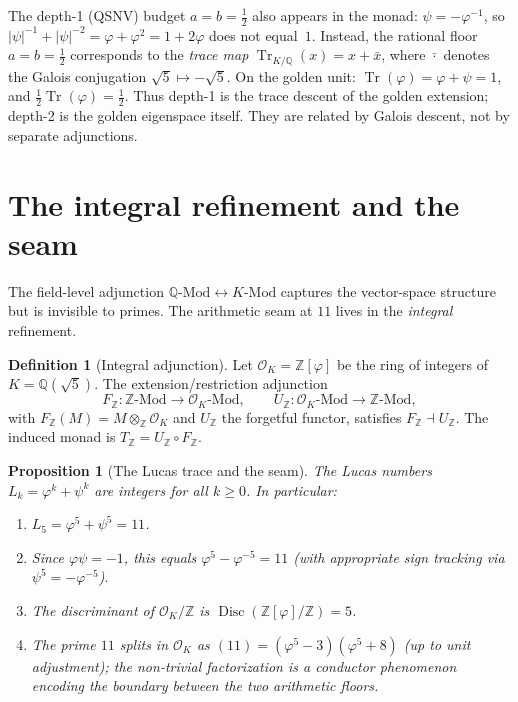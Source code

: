 \documentclass[11pt,a4paper]{article}
\theoremstyle{plain}
\newtheorem{proposition}[theorem]{Proposition}
\theoremstyle{definition}
\newtheorem{definition}[theorem]{Definition}
\theoremstyle{remark}
\numberwithin{equation}{section}
\providecommand{\Z}{\mathbb{Z}}
\providecommand{\Q}{\mathbb{Q}}
\providecommand{\vp}{\varphi}
\providecommand{\ps}{\psi}
\providecommand{\half}{\tfrac{1}{2}}
\providecommand{\Lk}{L}
\DeclareMathOperator{\Tr}{Tr}
\DeclareMathOperator{\Disc}{Disc}
\begin{document}
The depth-1 (QSNV) budget $a = b = \half$ also appears in the
monad: $\ps = -\vp^{-1}$, so $|\ps|^{-1} + |\ps|^{-2} =
\vp + \vp^2 = 1 + 2\vp$ does not equal~$1$.  Instead, the
rational floor $a = b = \half$ corresponds to the
\emph{trace map} $\Tr_{K/\Q}(x) = x + \bar{x}$, where
$\bar{\cdot}$ denotes the Galois conjugation $\sqrt{5} \mapsto
-\sqrt{5}$.  On the golden unit: $\Tr(\vp) = \vp + \ps = 1$,
and $\half \Tr(\vp) = \half$.  Thus depth-1 is the trace
descent of the golden extension; depth-2 is the golden
eigenspace itself.  They are related by Galois descent, not by
separate adjunctions.


\section{The integral refinement and the seam}
\label{sec:integral}

The field-level adjunction $\Q\text{-Mod} \leftrightarrow
K\text{-Mod}$ captures the vector-space structure but is
invisible to primes.  The arithmetic seam at $11$ lives in the
\emph{integral} refinement.

\begin{definition}[Integral adjunction]
\label{def:integral-adjunction}
Let $\mathcal{O}_K = \Z[\vp]$ be the ring of integers of
$K = \Q(\sqrt{5})$.  The extension/restriction adjunction
\[
  F_\Z \colon \Z\text{-Mod} \to \mathcal{O}_K\text{-Mod},
  \qquad
  U_\Z \colon \mathcal{O}_K\text{-Mod} \to \Z\text{-Mod},
\]
with $F_\Z(M) = M \otimes_\Z \mathcal{O}_K$ and $U_\Z$ the
forgetful functor, satisfies $F_\Z \dashv U_\Z$.  The induced
monad is $T_\Z = U_\Z \circ F_\Z$.
\end{definition}

\begin{proposition}[The Lucas trace and the seam]
\label{prop:seam-integral}
The Lucas numbers $\Lk_k = \vp^k + \ps^k$ are integers for all
$k \geq 0$.  In particular:
\begin{enumerate}[label=(\roman*)]
  \item $\Lk_5 = \vp^5 + \ps^5 = 11$.
  \item Since $\vp \ps = -1$, this equals
    $\vp^5 - \vp^{-5} = 11$ (with appropriate sign tracking via
    $\ps^5 = -\vp^{-5}$).
  \item The discriminant of $\mathcal{O}_K / \Z$ is
    $\Disc(\Z[\vp] / \Z) = 5$.
  \item The prime $11$ splits in $\mathcal{O}_K$ as
    $(11) = (\vp^5 - 3)(\vp^5 + 8)$ (up to unit adjustment);
    the non-trivial factorization is a conductor phenomenon
    encoding the boundary between the two arithmetic floors.
\end{enumerate}
\end{proposition}
\end{document}
